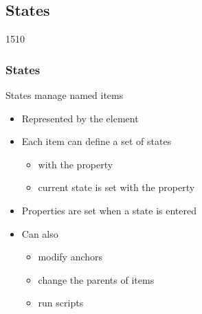 %
%
%
%

\subsection{States}


\begin{slide}{1510}\frametitle{States}

States manage named items

\begin{itemize}
\item Represented by the  element
\item Each item can define a set of states
  \begin{itemize}
  \item with the  property
  \item current state is set with the  property
  \end{itemize}
\item Properties are set when a state is entered
\item Can also
  \begin{itemize}
  \item modify anchors
  \item change the parents of items
  \item run scripts
  \end{itemize}
\end{itemize}

\end{slide}


